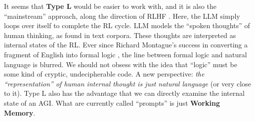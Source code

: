 \documentclass[runningheads]{llncs}
\begin{document}

It seems that \textbf{Type L} would be easier to work with, and it is also the ``mainstream'' approach, along the direction of RLHF \cite{RLHF}.  Here, the LLM simply loops over itself to complete the RL cycle.  LLM models the ``spoken thoughts'' of human thinking, as found in text corpora.  These thoughts are interpreted as internal states of the RL.  Ever since Richard Montague's success in converting a fragment of English into formal logic \cite{Montague}, the line between formal logic and natural language is blurred.  We should not obsess with the idea that ``logic'' must be some kind of cryptic, undecipherable code.  A new perspective: \textit{the ``representation'' of human internal thought is just natural language} (or very close to it).  Type L also has the advantage that we can directly examine the internal state of an AGI.  What are currently called ``prompts'' is just \textbf{Working Memory}.
\end{document}
